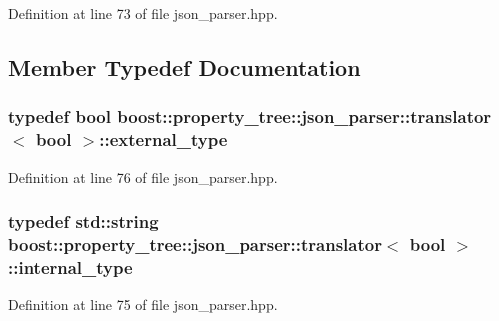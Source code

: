 Definition at line 73 of file json\-\_\-parser.\-hpp.



\subsection{Member Typedef Documentation}
\hypertarget{structboost_1_1property__tree_1_1json__parser_1_1translator_3_01bool_01_4_a735dcf537d03fd03712c193e56de30bc}{
\subsubsection[{external\-\_\-type}]{\setlength{\rightskip}{0pt plus 5cm}typedef bool {\bf boost\-::property\-\_\-tree\-::json\-\_\-parser\-::translator}$<$ bool $>$\-::{\bf external\-\_\-type}}}\label{structboost_1_1property__tree_1_1json__parser_1_1translator_3_01bool_01_4_a735dcf537d03fd03712c193e56de30bc}


Definition at line 76 of file json\-\_\-parser.\-hpp.

\hypertarget{structboost_1_1property__tree_1_1json__parser_1_1translator_3_01bool_01_4_afb06d7dd56a70ab4a34df47427f9498d}{
\subsubsection[{internal\-\_\-type}]{\setlength{\rightskip}{0pt plus 5cm}typedef std\-::string {\bf boost\-::property\-\_\-tree\-::json\-\_\-parser\-::translator}$<$ bool $>$\-::{\bf internal\-\_\-type}}}\label{structboost_1_1property__tree_1_1json__parser_1_1translator_3_01bool_01_4_afb06d7dd56a70ab4a34df47427f9498d}


Definition at line 75 of file json\-\_\-parser.\-hpp.



